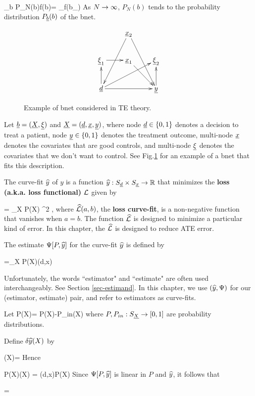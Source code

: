 \beq
\sum_b P_N(b)f(b)=
\sum_\s f(b_\s)
\eeq
As $N\rightarrow \infty$, $P_N(b)$ tends
to the probability distribution $P_{\underline{b}}(b)$
of the bnet.
\begin{figure}[h!]
$$
\xymatrix{
&\rvx_2\ar[ddl]\ar[ddr]
\\
\ul{\xi}_1\ar[r]
&\rvx_1\ar[dr]
&\ul{\xi}_2
\\
\rvd\ar[rr]\ar[u]\ar[rru]
&
&\rvy\ar[u]
}
$$
\caption{Example of bnet considered in TE
theory.}
\label{fig-targeted-bnet}
\end{figure}

Let ${\underline{b}}=({\underline{X}}, \underline{\xi})$ and
${\underline{X}}=({\underline{d}}, {\underline{x}},{\underline{y}})$,
where
node ${\underline{d}}\in\{0,1\}$ denotes a decision to treat a patient,
node ${\underline{y}}\in \{0,1\}$ denotes the treatment outcome,
multi-node ${\underline{x}}$ denotes the covariates
that are good controls, and multi-node $\underline{\xi}$ denotes
the covariates that we don't want to control.
See Fig.\ref{fig-targeted-bnet}
for an example of a bnet that fits this description.


The curve-fit ${\widehat{y}}$ of $y$
is a function ${\widehat{y}}:S_{\underline{d}}\times S_{\underline{x}}\rightarrow { \mathbb{R}}$
that minimizes the {\bf loss (a.k.a. loss functional)} ${\cal L}$
given by


\beq
\call[P, \haty]= \sum_X P(X) \hatl[y, \haty(d,x)]^2
\;,
\eeq
where ${\widehat{{\cal L}}}(a,b)$, the {\bf loss
curve-fit}, is a
non-negative function
that vanishes when $a=b$.
The function ${\widehat{{\cal L}}}$ is designed
to minimize a particular kind of error.
In this chapter, the ${\widehat{{\cal L}}}$
is designed to reduce ATE error.


The estimate
 $\Psi[P, {\widehat{y}}]$ for the curve-fit ${\widehat{y}}$
is defined by

\beq
\Psi[P, \haty] =\sum_X P(X)\haty(d,x)
\eeq

Unfortunately, the words ``estimator"
and ``estimate" are often used
interchangeably. See Section
\ref{sec-estimand}.
In this chapter, we use $({\widehat{y}}, \Psi)$
for our (estimator, estimate) pair,
and refer to estimators as curve-fits.


Let
\beq
\delta P(X)=
P(X)-P_{in}(X)
\eeq
where $P, P_{in}:S_{\underline{X}}\rightarrow [0,1]$ are
probability distributions.

Define $\delta{\widehat{y}}(X)$ by

\beq
\delta\haty(X)= 
\eeq
Hence

\beq
P(X)\delta\haty(X) = \haty(d,x)\delta P(X)
\eeq
Since $\Psi[P, {\widehat{y}}]$
is linear in $P$ and ${\widehat{y}}$,
it follows that

\beq
{}=
\eeq


